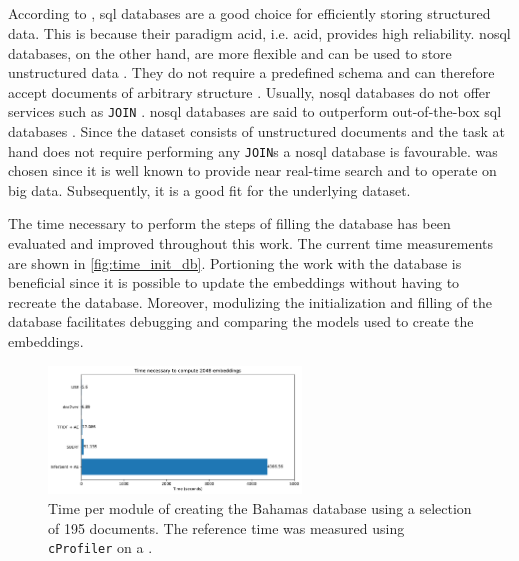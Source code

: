 \subsection*{\databaseName{}}\label{subsec:evaluation-db}
According to \cite{flask_book2018}, \ac{sql} databases are a good choice for efficiently storing structured data.
This is because their paradigm \acs{acid}, i.e. \acl{acid}, provides high reliability.
\ac{nosql} databases, on the other hand, are more flexible and can be used to store unstructured data \cite{flask_book2018}.
They do not require a predefined schema and can therefore accept documents of arbitrary structure \cite{flask2018}.
Usually, \ac{nosql} databases do not offer services such as \texttt{JOIN} \cite{flask2018}.
\ac{nosql} databases are said to outperform out-of-the-box \ac{sql} databases \cite{flask2018}.
Since the dataset consists of unstructured documents and the task at hand does not require performing any \texttt{JOIN}s a \ac{nosql} database is favourable.
\databaseName{} was chosen since it is well known to provide near real-time search and to operate on big data.
Subsequently, it is a good fit for the underlying dataset.

The time necessary to perform the steps of filling the \databaseName{} database has been evaluated and improved throughout this work.
The current time measurements are shown in \autoref{fig:time_init_db}.
Portioning the work with the database is beneficial since it is possible to update the embeddings without having to recreate the database.
Moreover, modulizing the initialization and filling of the database facilitates debugging and comparing the models used to create the embeddings.

\begin{figure}[htp] %
    \centering
    \includegraphics[width=0.6\textwidth]{images/Elasticsearch/Time_necessary_to_compute_2048_embeddings.pdf}
    \caption[Times for creating the database]{Time per module of creating the Bahamas database using a selection of 195 documents.
    The reference time was measured using \texttt{cProfiler} on a \localMaschineStats{}.
    }
    \label{fig:time_init_db}
\end{figure}

